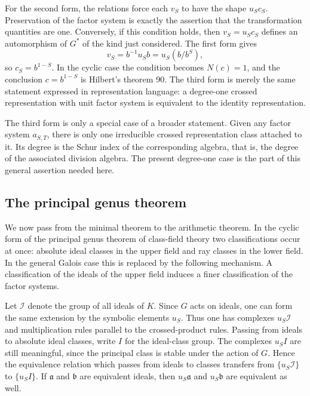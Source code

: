 \documentclass[12pt]{article}
\begin{document}
For the second form, the relations force each \(v_S\) to have the shape \(u_S c_S\). Preservation of the factor system is exactly the assertion that the transformation quantities are one. Conversely, if this condition holds, then \(v_S=u_Sc_S\) defines an automorphism of \(G^*\) of the kind just considered. The first form gives
\[
  v_S=b^{-1}u_Sb=u_S(b/b^S),
\]
so \(c_S=b^{1-S}\). In the cyclic case the condition becomes \(N(c)=1\), and the conclusion \(c=b^{1-S}\) is Hilbert's theorem 90. The third form is merely the same statement expressed in representation language: a degree-one crossed representation with unit factor system is equivalent to the identity representation.

The third form is only a special case of a broader statement. Given any factor system \(a_{S,T}\), there is only one irreducible crossed representation class attached to it. Its degree is the Schur index of the corresponding algebra, that is, the degree of the associated division algebra. The present degree-one case is the part of this general assertion needed here.

\subsection{The principal genus theorem}

We now pass from the minimal theorem to the arithmetic theorem. In the cyclic form of the principal genus theorem of class-field theory two classifications occur at once: absolute ideal classes in the upper field and ray classes in the lower field. In the general Galois case this is replaced by the following mechanism. A classification of the ideals of the upper field induces a finer classification of the factor systems.

Let \(\mathcal I\) denote the group of all ideals of \(K\). Since \(G\) acts on ideals, one can form the same extension by the symbolic elements \(u_S\). Thus one has complexes \(u_S\mathcal I\) and multiplication rules parallel to the crossed-product rules. Passing from ideals to absolute ideal classes, write \(I\) for the ideal-class group. The complexes \(u_S I\) are still meaningful, since the principal class is stable under the action of \(G\). Hence the equivalence relation which passes from ideals to classes transfers from \(\{u_S\mathcal I\}\) to \(\{u_S I\}\). If \(\mathfrak a\) and \(\mathfrak b\) are equivalent ideals, then \(u_S\mathfrak a\) and \(u_S\mathfrak b\) are equivalent as well.
\end{document}
